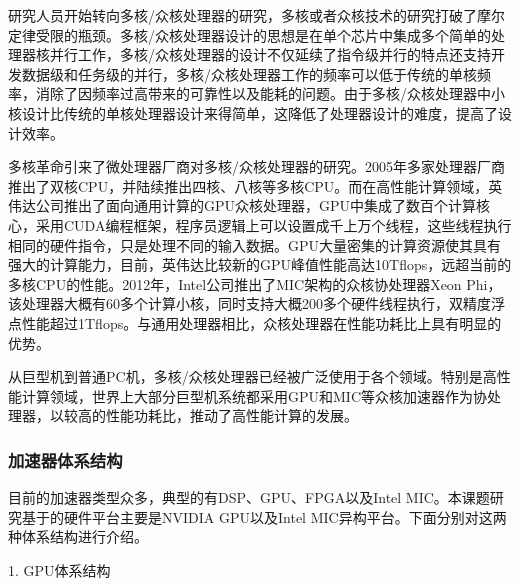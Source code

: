        研究人员开始转向多核/众核处理器的研究，多核或者众核技术的研究打破了摩尔定律受限的瓶颈。多核/众核处理器设计的思想是在单个芯片中集成多个简单的处理器核并行工作，多核/众核处理器的设计不仅延续了指令级并行的特点还支持开发数据级和任务级的并行，多核/众核处理器工作的频率可以低于传统的单核频率，消除了因频率过高带来的可靠性以及能耗的问题。由于多核/众核处理器中小核设计比传统的单核处理器设计来得简单，这降低了处理器设计的难度，提高了设计效率。
       
       多核革命引来了微处理器厂商对多核/众核处理器的研究。2005年多家处理器厂商推出了双核CPU，并陆续推出四核、八核等多核CPU。而在高性能计算领域，英伟达公司推出了面向通用计算的GPU众核处理器，GPU中集成了数百个计算核心，采用CUDA编程框架，程序员逻辑上可以设置成千上万个线程，这些线程执行相同的硬件指令，只是处理不同的输入数据。GPU大量密集的计算资源使其具有强大的计算能力，目前，英伟达比较新的GPU峰值性能高达10Tflops，远超当前的多核CPU的性能。2012年，Intel公司推出了MIC架构的众核协处理器Xeon Phi，该处理器大概有60多个计算小核，同时支持大概200多个硬件线程执行，双精度浮点性能超过1Tflops。与通用处理器相比，众核处理器在性能功耗比上具有明显的优势。
       
       从巨型机到普通PC机，多核/众核处理器已经被广泛使用于各个领域。特别是高性能计算领域，世界上大部分巨型机系统都采用GPU和MIC等众核加速器作为协处理器，以较高的性能功耗比，推动了高性能计算的发展。

       \subsubsection{加速器体系结构}
       目前的加速器类型众多，典型的有DSP、GPU、FPGA以及Intel MIC。本课题研究基于的硬件平台主要是NVIDIA GPU以及Intel MIC异构平台。下面分别对这两种体系结构进行介绍。
       
       1. GPU体系结构
       
